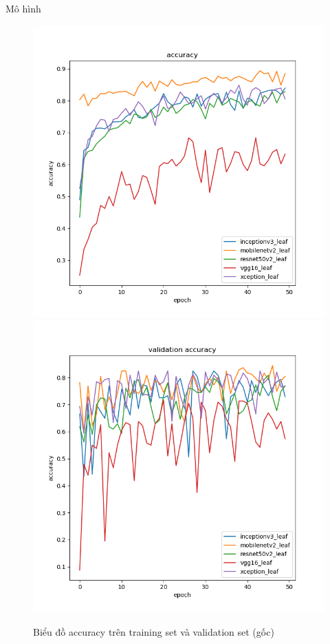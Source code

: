 \documentclass{beamer}
\begin{document}
\begin{frame}[allowframebreaks]{Mô hình}
	\begin{figure}[H]
		\centering
		\includegraphics[scale=0.25]{images/leaf_accuracy.png}
		\includegraphics[scale=0.25]{images/leaf_val_accuracy.png}
		\caption{Biểu đồ accuracy trên training set và validation set (gốc)}
	\end{figure}


\end{frame}
\end{document}
